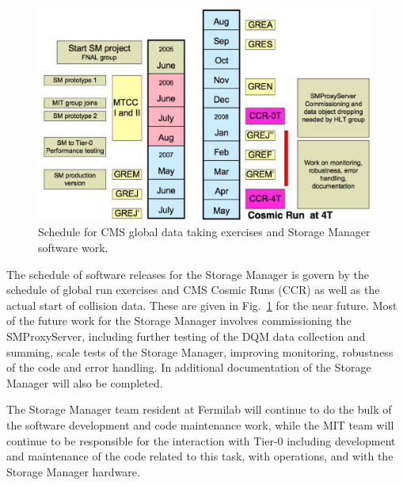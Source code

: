 \begin{figure}[hbtp]
  \begin{center}
    \includegraphics[width=5.5in]{Software/sw_schedule3.eps}
    \caption{Schedule for CMS global data taking exercises and Storage Manager
software work.}
    \label{fig:sw_schedule}
  \end{center}
\end{figure}

The schedule of software releases for the Storage Manager is govern by the
schedule of global run exercises and CMS Cosmic Runs (CCR) as well as
the actual start of collision data. These are given
in Fig.~\ref{fig:sw_schedule} for the near future. Most of the future work for the
Storage Manager involves commissioning the SMProxyServer, including further testing of the
DQM data collection and summing, scale tests of the Storage Manager, improving
monitoring, robustness of the code and error handling. In additional documentation
of the Storage Manager will also be completed.

The Storage Manager team resident at Fermilab will continue to do the bulk of the
software development and code maintenance work, while the MIT team will continue to
be responsible for the interaction with Tier-0 including development and maintenance of
the code related to this task, with operations, and with the
Storage Manager hardware.

